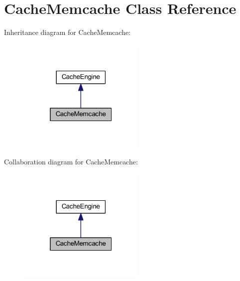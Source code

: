 \hypertarget{class_cache_memcache}{\section{Cache\-Memcache Class Reference}
\label{class_cache_memcache}
}


Inheritance diagram for Cache\-Memcache\-:
\nopagebreak
\begin{figure}[H]
\begin{center}
\leavevmode
\includegraphics[width=172pt]{class_cache_memcache__inherit__graph}
\end{center}
\end{figure}


Collaboration diagram for Cache\-Memcache\-:
\nopagebreak
\begin{figure}[H]
\begin{center}
\leavevmode
\includegraphics[width=172pt]{class_cache_memcache__coll__graph}
\end{center}
\end{figure}
